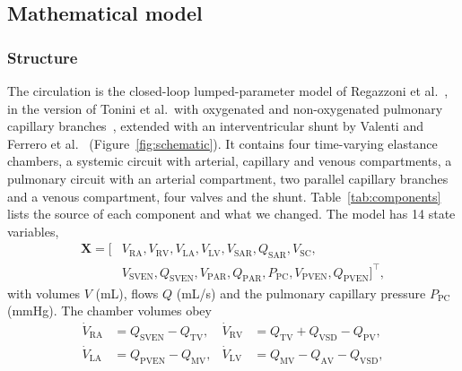 \documentclass{article}
\begin{document}
\FloatBarrier
\subsection{Mathematical model}
\label{sec:model}

\subsubsection{Structure}
The circulation is the closed-loop lumped-parameter model of Regazzoni et al.~\cite{Regazzoni2022}, in the version of Tonini et al.\ with oxygenated and non-oxygenated pulmonary capillary branches~\cite{Tonini2024,Tonini2025}, extended with an interventricular shunt by Valenti and Ferrero et al.~\cite{Valenti2023,Ferrero2026Shunts} (Figure~\ref{fig:schematic}). It contains four time-varying elastance chambers, a systemic circuit with arterial, capillary and venous compartments, a pulmonary circuit with an arterial compartment, two parallel capillary branches and a venous compartment, four valves and the shunt. Table~\ref{tab:components} lists the source of each component and what we changed. The model has 14 state variables,
\begin{equation}
\begin{split}\mathbf{X} = \big[ & V_{\mathrm{RA}}, V_{\mathrm{RV}}, V_{\mathrm{LA}}, V_{\mathrm{LV}}, V_{\mathrm{SAR}}, Q_{\mathrm{SAR}}, V_{\mathrm{SC}}, \\
  & V_{\mathrm{SVEN}}, Q_{\mathrm{SVEN}}, V_{\mathrm{PAR}}, Q_{\mathrm{PAR}}, P_{\mathrm{PC}}, V_{\mathrm{PVEN}}, Q_{\mathrm{PVEN}} \big]^{\top},\end{split}
\label{eq:state}
\end{equation}
with volumes $V$ (mL), flows $Q$ (mL/s) and the pulmonary capillary pressure $P_{\mathrm{PC}}$ (mmHg). The chamber volumes obey
\begin{equation}
\begin{aligned}
\dot{V}_{\mathrm{RA}} &= Q_{\mathrm{SVEN}} - Q_{\mathrm{TV}}, &
\dot{V}_{\mathrm{RV}} &= Q_{\mathrm{TV}} + Q_{\mathrm{VSD}} - Q_{\mathrm{PV}}, \\
\dot{V}_{\mathrm{LA}} &= Q_{\mathrm{PVEN}} - Q_{\mathrm{MV}}, &
\dot{V}_{\mathrm{LV}} &= Q_{\mathrm{MV}} - Q_{\mathrm{AV}} - Q_{\mathrm{VSD}},
\end{aligned}
\label{eq:chambers}
\end{equation}
\end{document}
